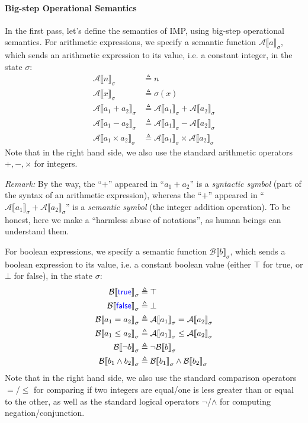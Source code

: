 \documentclass[11pt,a4paper]{article}
\let\defas\triangleq
\newcommand{\evalA}[2]{{\mathcal{A}\llbracket #1 \rrbracket}_{#2}}
\newcommand{\evalB}[2]{{\mathcal{B}\llbracket #1 \rrbracket}_{#2}}
\newcommand{\kword}[1]{{\color{blue} \textsf{#1}}}
\newcommand{\True}{\kword{true}}
\newcommand{\False}{\kword{false}}
\begin{document}
\paragraph{Big-step Operational Semantics}

In the first pass, let's define the semantics of IMP, using big-step operational semantics.
For arithmetic expressions, we specify a semantic function $\evalA{a}{\sigma}$, which sends an arithmetic expression to its value, i.e. a constant integer, in the state $\sigma$:
\begin{align*}
	\evalA{n}{\sigma} &\defas n \\
	\evalA{x}{\sigma} &\defas \sigma(x) \\
	\evalA{a_1 + a_2}{\sigma} &\defas \evalA{a_1}{\sigma} + \evalA{a_2}{\sigma} \\
	\evalA{a_1 - a_2}{\sigma} &\defas \evalA{a_1}{\sigma} - \evalA{a_2}{\sigma} \\
	\evalA{a_1 \times a_2}{\sigma} &\defas \evalA{a_1}{\sigma} \times \evalA{a_2}{\sigma}
\end{align*}
Note that in the right hand side, we also use the standard arithmetic operators $+,-,\times$ for integers.

\emph{Remark:}
By the way, the ``$+$'' appeared in ``$a_1 + a_2$'' is a \emph{syntactic symbol} (part of the syntax of an arithmetic expression), whereas the ``$+$'' appeared in ``$\evalA{a_1}{\sigma} + \evalA{a_2}{\sigma}$'' is a \emph{semantic symbol} (the integer addition operation).
To be honest, here we make a ``harmless abuse of notations'', as human beings can understand them.

For boolean expressions, we specify a semantic function $\evalB{b}{\sigma}$, which sends a boolean expression to its value, i.e. a constant boolean value (either $\top$ for true, or $\bot$ for false), in the state $\sigma$:
\begin{align*}
	\evalB{\True}{\sigma} &\defas \top \\
	\evalB{\False}{\sigma} &\defas \bot \\
	\evalB{a_1 = a_2}{\sigma} &\defas \evalA{a_1}{\sigma} = \evalA{a_2}{\sigma} \\
	\evalB{a_1 \le a_2}{\sigma} &\defas \evalA{a_1}{\sigma} \le \evalA{a_2}{\sigma} \\
	\evalB{\neg b}{\sigma} &\defas \neg \evalB{b}{\sigma} \\
	\evalB{b_1 \land b_2}{\sigma} &\defas \evalB{b_1}{\sigma} \land \evalB{b_2}{\sigma}
\end{align*}
Note that in the right hand side, we also use the standard comparison operators $=$/$\le$ for comparing if two integers are equal/one is less greater than or equal to the other, as well as the standard logical operators $\neg$/$\land$ for computing negation/conjunction.
\end{document}
